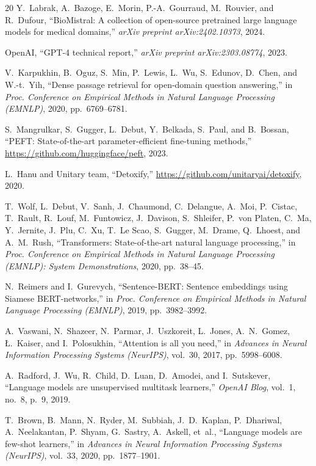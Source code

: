 \documentclass[conference]{IEEEtran}
\begin{document}
\begin{thebibliography}{20}
Y.~Labrak, A.~Bazoge, E.~Morin, P.-A.~Gourraud, M.~Rouvier, and R.~Dufour,
``BioMistral: A collection of open-source pretrained large language models for medical domains,''
\textit{arXiv preprint arXiv:2402.10373}, 2024.

OpenAI,
``GPT-4 technical report,''
\textit{arXiv preprint arXiv:2303.08774}, 2023.

V.~Karpukhin, B.~Oguz, S.~Min, P.~Lewis, L.~Wu, S.~Edunov, D.~Chen, and W.-t.~Yih,
``Dense passage retrieval for open-domain question answering,''
in \textit{Proc. Conference on Empirical Methods in Natural Language Processing (EMNLP)}, 2020, pp.~6769--6781.

S.~Mangrulkar, S.~Gugger, L.~Debut, Y.~Belkada, S.~Paul, and B.~Bossan,
``PEFT: State-of-the-art parameter-efficient fine-tuning methods,''
\url{https://github.com/huggingface/peft}, 2023.

L.~Hanu and Unitary team,
``Detoxify,''
\url{https://github.com/unitaryai/detoxify}, 2020.

T.~Wolf, L.~Debut, V.~Sanh, J.~Chaumond, C.~Delangue, A.~Moi, P.~Cistac, T.~Rault, R.~Louf, M.~Funtowicz, J.~Davison, S.~Shleifer, P.~von Platen, C.~Ma, Y.~Jernite, J.~Plu, C.~Xu, T.~Le Scao, S.~Gugger, M.~Drame, Q.~Lhoest, and A.~M.~Rush,
``Transformers: State-of-the-art natural language processing,''
in \textit{Proc. Conference on Empirical Methods in Natural Language Processing (EMNLP): System Demonstrations}, 2020, pp.~38--45.

N.~Reimers and I.~Gurevych,
``Sentence-BERT: Sentence embeddings using Siamese BERT-networks,''
in \textit{Proc. Conference on Empirical Methods in Natural Language Processing (EMNLP)}, 2019, pp.~3982--3992.

A.~Vaswani, N.~Shazeer, N.~Parmar, J.~Uszkoreit, L.~Jones, A.~N.~Gomez, {\L}.~Kaiser, and I.~Polosukhin,
``Attention is all you need,''
in \textit{Advances in Neural Information Processing Systems (NeurIPS)}, vol.~30, 2017, pp.~5998--6008.

A.~Radford, J.~Wu, R.~Child, D.~Luan, D.~Amodei, and I.~Sutskever,
``Language models are unsupervised multitask learners,''
\textit{OpenAI Blog}, vol.~1, no.~8, p.~9, 2019.

T.~Brown, B.~Mann, N.~Ryder, M.~Subbiah, J.~D.~Kaplan, P.~Dhariwal, A.~Neelakantan, P.~Shyam, G.~Sastry, A.~Askell, et~al.,
``Language models are few-shot learners,''
in \textit{Advances in Neural Information Processing Systems (NeurIPS)}, vol.~33, 2020, pp.~1877--1901.


\end{thebibliography}
\end{document}
